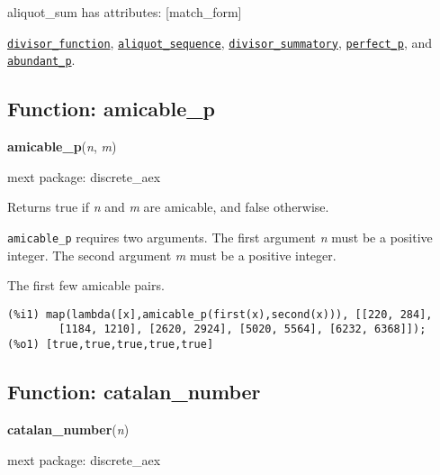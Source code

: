 \documentclass[]{article}
\begin{document}
\vspace{5 pt}

aliquot\_sum has attributes: [match\_form]

\vspace{5 pt}


  \hyperlink{divisor_function}{{\tt divisor\_function}}, \hyperlink{aliquot_sequence}{{\tt aliquot\_sequence}}, \hyperlink{divisor_summatory}{{\tt divisor\_summatory}}, \hyperlink{perfect_p}{{\tt perfect\_p}}, and \hyperlink{abundant_p}{{\tt abundant\_p}}.

\vspace{5 pt}


\subsection{Function: amicable\_p\label{sec:amicable_p}}
\hypertarget{amicable_p}{}
{\bf amicable\_p}({\it n}, {\it m})


\noindent mext package: discrete\_aex



\vspace{5 pt}
Returns true if {\it n} and {\it m} are amicable, and false otherwise. 

\vspace{5 pt}

   {\tt amicable\_p} requires two arguments.
    The first argument {\it n} must be a positive integer.
    The second argument {\it m} must be a positive integer.


\vspace{5 pt}


   The first few amicable pairs. 

\begin{Verbatim}[frame=single]
(%i1) map(lambda([x],amicable_p(first(x),second(x))), [[220, 284], 
        [1184, 1210], [2620, 2924], [5020, 5564], [6232, 6368]]);
(%o1) [true,true,true,true,true]
\end{Verbatim}


\subsection{Function: catalan\_number\label{sec:catalan_number}}
\hypertarget{catalan_number}{}
{\bf catalan\_number}({\it n})


\noindent mext package: discrete\_aex
\end{document}
